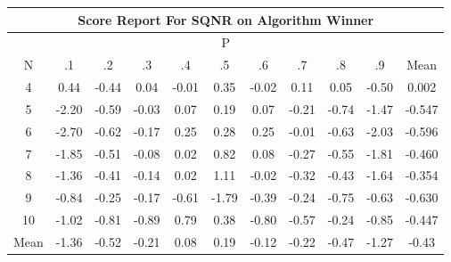 \documentclass[11pt,a4paper]{report}
\begin{document}
\begin{longtable}{ | c || c | c | c | c | c | c | c | c | c || c |}
\hline
\multicolumn{11}{|c|}{ Score Report For SQNR on Algorithm Winner} \\
\hline
\multicolumn{11}{|c|}{ P } \\
\hline
N & .1 & .2 & .3 & .4 & .5 & .6 & .7 & .8 & .9 & Mean\\
 \hline
 \hline
 \endhead
  4 &  \cellcolor[HTML]{F7F7FF} 0.44 &  \cellcolor[HTML]{FFF7F7} -0.44 &  \cellcolor[HTML]{FFFFFF} 0.04 &  \cellcolor[HTML]{FFFFFF} -0.01 &  \cellcolor[HTML]{F7F7FF} 0.35 &  \cellcolor[HTML]{FFFFFF} -0.02 &  \cellcolor[HTML]{FFFFFF} 0.11 &  \cellcolor[HTML]{FFFFFF} 0.05 &  \cellcolor[HTML]{FFEFEF} -0.50 & 0.002 \\
  5 &  \cellcolor[HTML]{FFC7C7} -2.20 &  \cellcolor[HTML]{FFEFEF} -0.59 &  \cellcolor[HTML]{FFFFFF} -0.03 &  \cellcolor[HTML]{FFFFFF} 0.07 &  \cellcolor[HTML]{F7F7FF} 0.19 &  \cellcolor[HTML]{FFFFFF} 0.07 &  \cellcolor[HTML]{FFF7F7} -0.21 &  \cellcolor[HTML]{FFEFEF} -0.74 &  \cellcolor[HTML]{FFD7D7} -1.47 & -0.547 \\
  6 &  \cellcolor[HTML]{FFBFBF} -2.70 &  \cellcolor[HTML]{FFEFEF} -0.62 &  \cellcolor[HTML]{FFF7F7} -0.17 &  \cellcolor[HTML]{F7F7FF} 0.25 &  \cellcolor[HTML]{F7F7FF} 0.28 &  \cellcolor[HTML]{F7F7FF} 0.25 &  \cellcolor[HTML]{FFFFFF} -0.01 &  \cellcolor[HTML]{FFEFEF} -0.63 &  \cellcolor[HTML]{FFCFCF} -2.03 & -0.596 \\
  7 &  \cellcolor[HTML]{FFCFCF} -1.85 &  \cellcolor[HTML]{FFEFEF} -0.51 &  \cellcolor[HTML]{FFFFFF} -0.08 &  \cellcolor[HTML]{FFFFFF} 0.02 &  \cellcolor[HTML]{E7E7FF} 0.82 &  \cellcolor[HTML]{FFFFFF} 0.08 &  \cellcolor[HTML]{FFF7F7} -0.27 &  \cellcolor[HTML]{FFEFEF} -0.55 &  \cellcolor[HTML]{FFCFCF} -1.81 & -0.460 \\
  8 &  \cellcolor[HTML]{FFDFDF} -1.36 &  \cellcolor[HTML]{FFF7F7} -0.41 &  \cellcolor[HTML]{FFFFFF} -0.14 &  \cellcolor[HTML]{FFFFFF} 0.02 &  \cellcolor[HTML]{DFDFFF} 1.11 &  \cellcolor[HTML]{FFFFFF} -0.02 &  \cellcolor[HTML]{FFF7F7} -0.32 &  \cellcolor[HTML]{FFF7F7} -0.43 &  \cellcolor[HTML]{FFD7D7} -1.64 & -0.354 \\
  9 &  \cellcolor[HTML]{FFE7E7} -0.84 &  \cellcolor[HTML]{FFF7F7} -0.25 &  \cellcolor[HTML]{FFF7F7} -0.17 &  \cellcolor[HTML]{FFEFEF} -0.61 &  \cellcolor[HTML]{FFCFCF} -1.79 &  \cellcolor[HTML]{FFF7F7} -0.39 &  \cellcolor[HTML]{FFF7F7} -0.24 &  \cellcolor[HTML]{FFEFEF} -0.75 &  \cellcolor[HTML]{FFEFEF} -0.63 & -0.630 \\
  10 &  \cellcolor[HTML]{FFE7E7} -1.02 &  \cellcolor[HTML]{FFE7E7} -0.81 &  \cellcolor[HTML]{FFE7E7} -0.89 &  \cellcolor[HTML]{EFEFFF} 0.79 &  \cellcolor[HTML]{F7F7FF} 0.38 &  \cellcolor[HTML]{FFE7E7} -0.80 &  \cellcolor[HTML]{FFEFEF} -0.57 &  \cellcolor[HTML]{FFF7F7} -0.24 &  \cellcolor[HTML]{FFE7E7} -0.85 & -0.447 \\
 \hline
 \hline
Mean &  \cellcolor[HTML]{FFDFDF} -1.36 &  \cellcolor[HTML]{FFEFEF} -0.52 &  \cellcolor[HTML]{FFF7F7} -0.21 &  \cellcolor[HTML]{FFFFFF} 0.08 &  \cellcolor[HTML]{F7F7FF} 0.19 &  \cellcolor[HTML]{FFFFFF} -0.12 &  \cellcolor[HTML]{FFF7F7} -0.22 &  \cellcolor[HTML]{FFF7F7} -0.47 &  \cellcolor[HTML]{FFDFDF} -1.27 &  \cellcolor[HTML]{FFF7F7} -0.43
\end{longtable}
\end{document}
